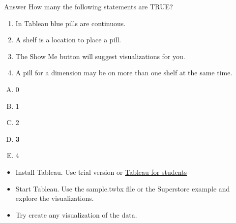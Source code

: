 \documentclass[xcolor=svgnames]{beamer} %
\begin{document}
\begin{frame}
\begin{block}{Answer}
How many the following statements are TRUE?
\begin{enumerate}
\item In Tableau blue pills are continuous.\pxmark
\item A shelf is a location to place a pill.  \pcmark
\item The Show Me button will suggest visualizations for you.  \pcmark
\item A pill for a dimension may be on more than one shelf at the same time.  \pcmark
\end{enumerate}
\begin{multicols}{5}
\begin{enumerate}[A)]
\item 0 
\item 1
\item 2
\item {\bf 3}
\item 4
\end{enumerate}
\end{multicols}
\end{block}
\end{frame}


\begin{frame}
\begin{example}
\begin{itemize}
\item Install Tableau. Use trial version or \href{https://www.tableau.com/academic/students}{Tableau for students}
\item Start Tableau. Use the sample.twbx file or the Superstore example and explore the visualizations.
\item Try create any visualization of the data.
\end{itemize}
\end{example}
\end{frame}
\end{document}
